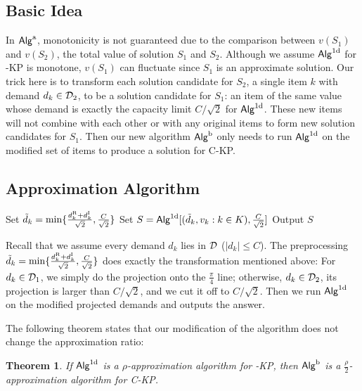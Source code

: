 \documentclass{aamas2013}
\newtheorem{theorem}{Theorem}[section]
\begin{document}
\subsection{Basic Idea} \label{subsec:pic}
\noindent
In ${\sf Alg}^{\rm a}$, monotonicity is not guaranteed due to the comparison between $v(S_1)$ and $v(S_2)$, the total value of solution $S_1$ and $S_2$.  Although we assume ${\sf Alg}^{\rm 1d}$ for {-KP} is monotone, $v(S_1)$ can fluctuate since $S_1$ is an approximate solution.  Our trick here is to transform each solution candidate for $S_2$, a single item $k$ with demand $d_k\in {\cal D}_2$, to be a solution candidate for $S_1$: an item of the same value whose demand is exactly the capacity limit $C/\sqrt{2}$ for ${\sf Alg}^{\rm 1d}$.  These new items will not combine with each other or with any original items to form new solution candidates for $S_1$.  Then our new algorithm ${\sf Alg}^{\rm b}$ only needs to run ${\sf Alg}^{\rm 1d}$ on the modified set of items to produce a solution for C-KP.  
  

\subsection{Approximation Algorithm} 

\begin{algorithm}[htb!]
\caption{${\sf Alg}^{\rm b} [(d_k,v_k: k \in K), C]$}
\begin{algorithmic}[1]
\STATE Set $\tilde{d}_k =  \min\{ \frac{d_k^{\rm R}+d_k^{\rm I}}{\sqrt{2}}, \frac{C}{\sqrt{2}} \}$
\ENDFOR
\STATE Set $S = {\sf Alg}^{\rm 1d}[(\tilde{d}_k,v_k: k \in K),\frac{C}{\sqrt{2}}]$
\STATE Output $S$
\end{algorithmic}
\end{algorithm}

\noindent Recall that we assume every demand $d_k$ lies in ${\cal D}$ ($|d_k|\leq C$).  The preprocessing $\tilde{d}_k =  \min\{ \frac{d_k^{\rm R}+d_k^{\rm I}}{\sqrt{2}}, \frac{C}{\sqrt{2}} \}$ does exactly the transformation mentioned above: For $d_k\in {\cal D}_1$, we simply do the projection onto the $\frac{\pi}{4}$ line; otherwise, $d_k\in {\cal D}_2$, its projection is larger than $C/\sqrt{2}$, and we cut it off to $C/\sqrt{2}$.  Then we run ${\sf Alg}^{\rm 1d}$ on the modified projected demands and outputs the answer.  

The following theorem states that our modification of the algorithm does not change the approximation ratio:
\begin{theorem} 
\label{thm:2apxb}
If ${\sf Alg}^{\rm 1d}$ is a $\rho$-approximation algorithm for {-KP}, then ${\sf Alg}^{\rm b}$ is a $\frac{\rho}{2}$-approximation algorithm for {\sc C-KP}.
\end{theorem}
\end{document}
